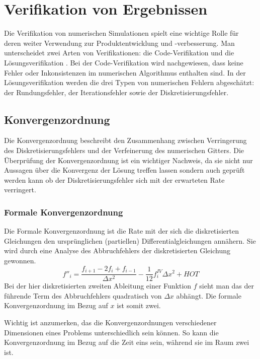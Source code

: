 \section{Verifikation von Ergebnissen}
\label{sec:verifik_allg}

Die Verifikation von numerischen Simulationen spielt eine wichtige Rolle
für deren weiter Verwendung zur Produktentwicklung und -verbesserung.
Man unterscheidet zwei Arten von Verifikationen: die Code-Verifikation und die Lösungsverifikation
\cite{veluri}.
Bei der Code-Verifikation wird nachgewiesen, dass keine Fehler oder Inkonsistenzen im numerischen
Algorithmus enthalten sind. In der Lösungsverifikation werden die drei Typen von numerischen Fehlern
abgeschätzt: der Rundungsfehler, der Iterationsfehler sowie der Diskretisierungsfehler.

\subsection{Konvergenzordnung}

Die Konvergenzordnung beschreibt den Zusammenhang zwischen Verringerung des Diskretisierungsfehlers
und der Verfeinerung des numerischen Gitters.
Die Überprüfung der Konvergenzordnung ist ein wichtiger Nachweis, da sie nicht nur Aussagen über
die Konvergenz der Lösung treffen lassen sondern auch geprüft werden kann ob der Diskretisierungsfehler
sich mit der erwarteten Rate verringert.

\subsubsection{Formale Konvergenzordnung}

Die Formale Konvergenzordnung ist die Rate mit der sich die diskretisierten Gleichungen
den ursprünglichen (partiellen) Differentialgleichungen annähern.
Sie wird durch eine Analyse des Abbruchfehlers
der diskretisierten Gleichung gewonnen.
\begin{equation}
  f''_i = \frac{f_{i+1}-2f_i +f_{i-1}}{\Delta x^2} -\frac{1}{12} f^{IV}_i \Delta x^2 + HOT
\end{equation}
Bei der hier diskretisierten zweiten Ableitung einer Funktion $f$ sieht man das der führende
Term des Abbruchfehlers quadratisch von $\Delta x$ abhängt. Die formale Konvergenzordnung im Bezug
auf $x$ ist somit zwei.

Wichtig ist anzumerken, das die Konvergenzordnungen verschiedener Dimensionen
eines Problems unterschiedlich sein können. So kann die Konvergenzordnung im Bezug auf die Zeit eins sein,
während sie im Raum zwei ist.


